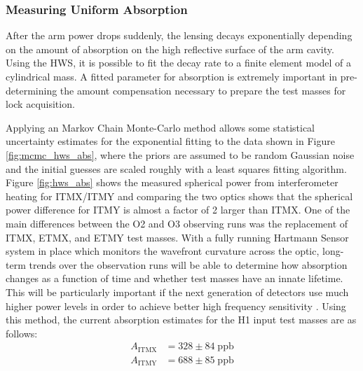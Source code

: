 	\subsubsection{Measuring Uniform Absorption}
	After the arm power drops suddenly, the lensing decays exponentially depending on the amount of absorption on the high reflective surface of the arm cavity.  Using the HWS, it is possible to fit the decay rate to a finite element model of a cylindrical mass.  A fitted parameter for absorption is extremely important in pre-determining the amount compensation necessary to prepare the test masses for lock acquisition.  
	
	Applying an Markov Chain Monte-Carlo method allows some statistical uncertainty estimates for the exponential fitting to the data shown in Figure \ref{fig:mcmc_hws_abs}, where the priors are assumed to be random Gaussian noise and the initial guesses are scaled roughly with a least squares fitting algorithm. Figure \ref{fig:hws_abs} shows the measured spherical power from interferometer heating for ITMX/ITMY and comparing the two optics shows that the spherical power difference for ITMY is almost a factor of 2 larger than ITMX. One of the main differences between the O2 and O3 observing runs was the replacement of ITMX, ETMX, and ETMY test masses.  With a fully running Hartmann Sensor system in place which monitors the wavefront curvature across the optic, long-term trends over the observation runs will be able to determine how absorption changes as a function of time and whether test masses have an innate lifetime.  This will be particularly important if the next generation of detectors use much higher power levels in order to achieve better high frequency sensitivity \cite{DanBrown_prvt}.  Using this method, the current absorption estimates for the H1 input test masses are as follows:
	\begin{equation}
	\begin{aligned}
	A_{\text{ITMX}} &= 328 \pm 84 \; \text{ppb}\\
	A_{\text{ITMY}} &= 688 \pm 85 \; \text{ppb}
	\end{aligned}
	\end{equation}
